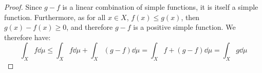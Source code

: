 \documentclass{article}
\newtheorem{theorem}{Theorem}[section]
\theoremstyle{definition}
\theoremstyle{remark}
\theoremstyle{example}
\theoremstyle{notation}
\theoremstyle{axiom}
\begin{document}
\begin{proof}
		Since $g - f$ is a linear combination of simple functions, it is itself a simple function. Furthermore, as for all $x \in X$, $f(x) \leq g(x)$, then $g(x) - f(x) \geq 0$, and therefore $g - f$ is a positive simple function. We therefore have:
				$$\int_X f \dd \mu \leq \int_X f \dd \mu + \int_X (g - f) \dd \mu = \int_X f + (g - f) \dd \mu = \int_X g \dd \mu$$
\end{proof}


		

\end{document}
